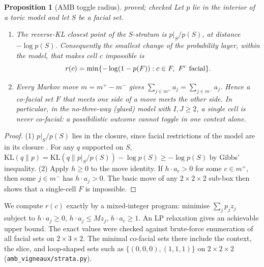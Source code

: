 \documentclass[11pt]{article}
\newtheorem{proposition}[theorem]{Proposition}
\theoremstyle{definition}
\theoremstyle{remark}
\newcommand{\st}[1]{\textsf{\small\color{gray}#1}}
\begin{document}
\begin{proposition}[AMB toggle radius]\label{prop:ambtoggle}\st{proved; checked}
Let $p$ lie in the interior of a toric model and let $S$ be a facial set.
\begin{enumerate}
  \item The reverse-KL closest point of the $S$-stratum is $p|_S/p(S)$, at distance $-\log p(S)$. Consequently the smallest change of the probability layer, within the model, that makes cell $c$ impossible is
  \[
  r(c)=\min\{-\log(1-p(F)) : c\in F,\ F^{\rm c}\text{ facial}\}.
  \]
  \item Every Markov move $m=m^+-m^-$ gives $\sum_{j\in m^+}a_j=\sum_{j\in m^-}a_j$. Hence a co-facial set $F$ that meets one side of a move meets the other side. In particular, in the no-three-way (glued) model with $I,J\ge2$, a single cell is never co-facial: \emph{a possibilistic outcome cannot toggle in one context alone}.
\end{enumerate}
\end{proposition}
\begin{proof}
(1) $p|_S/p(S)$ lies in the closure, since facial restrictions of the model are in its closure \cite{gms06}. For any $q$ supported on $S$, $\mathrm{KL}(q\|p)=\mathrm{KL}(q\|p|_S/p(S))-\log p(S)\ge-\log p(S)$ by Gibbs' inequality. (2) Apply $h\ge0$ to the move identity. If $h\cdot a_c>0$ for some $c\in m^+$, then some $j\in m^-$ has $h\cdot a_j>0$. The basic move of any $2\times2\times2$ sub-box then shows that a single-cell $F$ is impossible.
\end{proof}
\noindent We compute $r(c)$ exactly by a mixed-integer program: minimise $\sum_jp_jz_j$ subject to $h\cdot a_j\ge0$, $h\cdot a_j\le Mz_j$, $h\cdot a_c\ge1$. An LP relaxation gives an achievable upper bound. The exact values were checked against brute-force enumeration of all facial sets on $2\times3\times2$. The minimal co-facial sets there include the context, the slice, and loop-shaped sets such as $\{(0,0,0),(1,1,1)\}$ on $2\times2\times2$ (\texttt{amb\_vigneaux/strata.py}).
\end{document}

